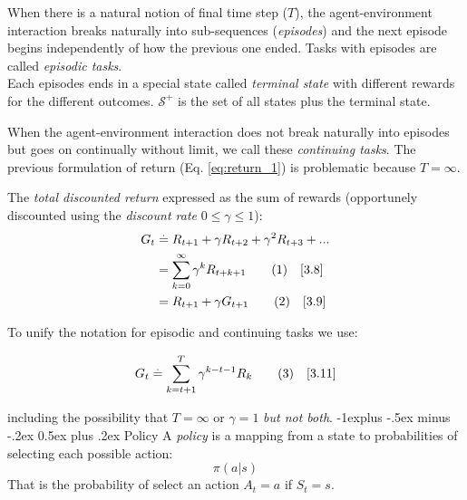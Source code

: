 \documentclass[10pt,landscape]{article}
\makeatletter
\renewcommand{\subsection}{\@startsection{subsection}{2}{0mm}%
                                {-1explus -.5ex minus -.2ex}%
                                {0.5ex plus .2ex}%
                                {\normalfont\normalsize\bfseries}}
\newcommand\numberthis{\addtocounter{equation}{1}\tag{\theequation}}
\makeatother
\begin{document}
\begin{multicols}{3}
When there is a natural notion of final time step ($T$), the agent-environment interaction breaks naturally into sub-sequences (\emph{episodes}) and the next episode begins independently of how the previous one ended. Tasks with episodes are called \emph{episodic tasks}. \\

Each episodes ends in a special state called \emph{terminal state} with different rewards for the different outcomes.  $\mathcal{S}^{+}$ is the set of all states plus the terminal state.

When the agent-environment interaction does not break naturally into episodes but goes on continually without limit, we call these \emph{continuing tasks}.
The previous formulation of return (Eq. \ref{eq:return_1}) is problematic because $T=\infty$. 

The \emph{total discounted return} expressed as the sum of rewards (opportunely discounted using the \emph{discount rate} $0 \le \gamma \le 1$):
\begin{align*}
G_t & \stackrel{.}{=} R_{t+1} + \gamma R_{t+2} + \gamma^2 R_{t+3} + ...\\
& = \sum_{k = 0}^\infty \gamma^k R_{t + k + 1} \numberthis \label{eq:discounted_return_1} \quad [3.8]\\
& = R_{t+1} + \gamma G_{t+1} \numberthis \label{eq:discounted_return_2} \quad [3.9]
\end{align*}

To unify the notation for episodic and continuing tasks we use:

\begin{equation}
G_t \stackrel{.}{=} \sum_{k = t+1}^T \gamma^{k-t-1} R_{k} \numberthis \label{eq:discounted_return_generic} \quad [3.11]
\end{equation}

including the possibility that $T=\infty$ or $\gamma = 1$ \emph{but not both}.
\subsection{Policy}
A \emph{policy} is a mapping from a state to probabilities of selecting each possible action:
\begin{equation}
\pi(a|s)
\label{eq: policy}
\end{equation}
That is the probability of select an action $A_t = a$ if $S_t = s$.


\end{multicols}
\end{document}
